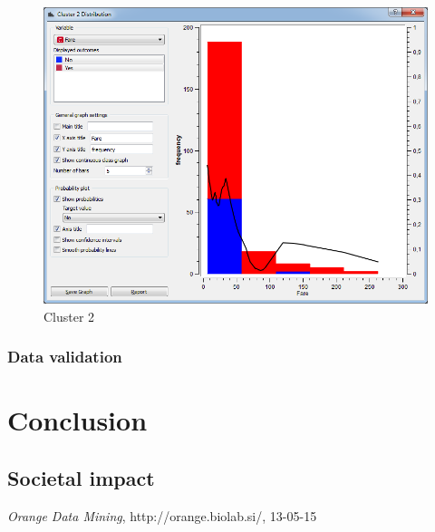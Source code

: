 \documentclass[a4paper,11pt]{article}
\begin{document}
\begin{figure}[h]
\begin{flushleft}
		\includegraphics[scale=0.30]{ClusterDistribution/Cluster2/Fare}
	\end{flushleft}
	\caption{Cluster 2}
	\label{ClusterTwo}
\end{figure}

\subsubsection{Data validation}

\section{Conclusion}
\subsection{Societal impact}




\appendix
\begin{thebibliography}{9}

  \emph{Orange Data Mining},
  http://orange.biolab.si/,
  13-05-15
\end{thebibliography}
\end{document}
